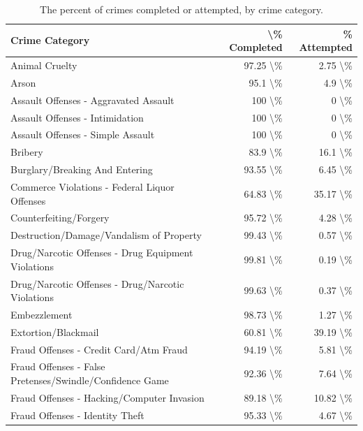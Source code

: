 \documentclass[
  12pt,
  openany]{book}
\begin{document}
\begin{longtable}[t]{lrr}
\caption{\label{tab:offensesCompleted}The percent of crimes completed or attempted, by crime category.}\\
\toprule
Crime Category & \textbackslash{}\% Completed & \% Attempted\\
\midrule
Animal Cruelty & 97.25 \textbackslash{}\% & 2.75 \textbackslash{}\%\\
Arson & 95.1 \textbackslash{}\% & 4.9 \textbackslash{}\%\\
Assault Offenses - Aggravated Assault & 100 \textbackslash{}\% & 0 \textbackslash{}\%\\
Assault Offenses - Intimidation & 100 \textbackslash{}\% & 0 \textbackslash{}\%\\
Assault Offenses - Simple Assault & 100 \textbackslash{}\% & 0 \textbackslash{}\%\\
\addlinespace
Bribery & 83.9 \textbackslash{}\% & 16.1 \textbackslash{}\%\\
Burglary/Breaking And Entering & 93.55 \textbackslash{}\% & 6.45 \textbackslash{}\%\\
Commerce Violations - Federal Liquor Offenses & 64.83 \textbackslash{}\% & 35.17 \textbackslash{}\%\\
Counterfeiting/Forgery & 95.72 \textbackslash{}\% & 4.28 \textbackslash{}\%\\
Destruction/Damage/Vandalism of Property & 99.43 \textbackslash{}\% & 0.57 \textbackslash{}\%\\
\addlinespace
Drug/Narcotic Offenses - Drug Equipment Violations & 99.81 \textbackslash{}\% & 0.19 \textbackslash{}\%\\
Drug/Narcotic Offenses - Drug/Narcotic Violations & 99.63 \textbackslash{}\% & 0.37 \textbackslash{}\%\\
Embezzlement & 98.73 \textbackslash{}\% & 1.27 \textbackslash{}\%\\
Extortion/Blackmail & 60.81 \textbackslash{}\% & 39.19 \textbackslash{}\%\\
Fraud Offenses - Credit Card/Atm Fraud & 94.19 \textbackslash{}\% & 5.81 \textbackslash{}\%\\
\addlinespace
Fraud Offenses - False Pretenses/Swindle/Confidence Game & 92.36 \textbackslash{}\% & 7.64 \textbackslash{}\%\\
Fraud Offenses - Hacking/Computer Invasion & 89.18 \textbackslash{}\% & 10.82 \textbackslash{}\%\\
Fraud Offenses - Identity Theft & 95.33 \textbackslash{}\% & 4.67 \textbackslash{}\%\\

\end{longtable}
\end{document}
